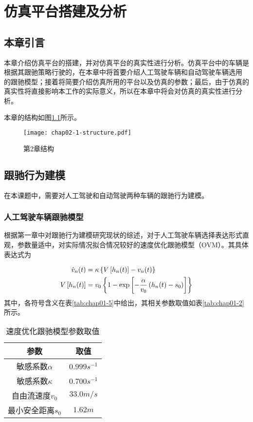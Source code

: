 
\chapter{仿真平台搭建及分析}

\section{本章引言}

本章介绍仿真平台的搭建，并对仿真平台的真实性进行分析。仿真平台中的车辆是根据其跟驰策略行驶的，在本章中将首要介绍人工驾驶车辆和自动驾驶车辆选用
的跟驰模型；接着将简要介绍仿真所用的平台以及仿真的参数；最后，由于仿真的真实性将直接影响本工作的实际意义，所以在本章中将会对仿真的真实性进行分析。

本章的结构如图\ref{fig:chap02-1-logic}所示。

\begin{figure}
  \centering
  \texttt{[image: chap02-1-structure.pdf]}
  \caption{第2章结构}
  \label{fig:chap02-1-logic}
\end{figure}

\section{跟驰行为建模}

在本课题中，需要对人工驾驶和自动驾驶两种车辆的跟驰行为建模。

\subsection{人工驾驶车辆跟驰模型}

根据第一章中对跟驰行为建模研究现状的综述，对于人工驾驶车辆选择表达形式直观，参数量适中，对实际情况拟合情况较好的速度优化跟驰模型（OVM）。其具体表达式为

\begin{align}
  \dot{v}_n(t) &= \kappa \left\{ V \left[ h_n(t) \right] - v_n(t) \right\} \notag \\
  V \left[ h_n(t) \right] &= v_0 \left\{ 1 - \exp \left[ - \frac{\alpha}{v_0}\left(h_n(t)-s_0\right) \right] \right\}
  \label{eq:chap02-1}
\end{align}
其中，各符号含义在表\ref{tab:chap01-5}中给出，其相关参数取值如表\ref{tab:chap01-2}所示。

\begin{table}
  \centering
  \caption{速度优化跟驰模型参数取值}
  \begin{tabular}{cc}
    \toprule
    参数          &  取值                         \\
    \midrule
    敏感系数$\alpha$        & $0.999s^{-1}$         \\
    敏感系数$\kappa$       & $0.700s^{-1}$             \\
    自由流速度$v_0$             & $33.0 m/s$          \\
    最小安全距离$s_0$             & $1.62m$        \\
    \bottomrule
  \end{tabular}
  \label{tab:chap02-1}
\end{table}

